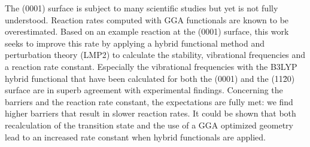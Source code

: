 \documentclass[11pt,DIV=13,BCOR=5mm,a4paper,headinclude]{scrbook}
\begin{document}
% 


The (0001) surface is subject to many scientific studies but yet is not fully understood.
Reaction rates computed with GGA functionals are known to be overestimated.
Based on an example reaction at the (0001) surface, this work seeks to improve this rate by applying a hybrid functional method and perturbation theory (LMP2) to calculate the stability, vibrational frequencies and a reaction rate constant.
Especially the vibrational frequencies with the B3LYP hybrid functional that have been calculated for both the (0001) and the (11\=20) surface are in superb agreement with experimental findings.
Concerning the barriers and the reaction rate constant, the expectations are fully met: we find higher barriers that result in slower reaction rates.
It could be shown that both recalculation of the transition state and the use of a GGA optimized geometry lead to an increased rate constant when hybrid functionals are applied.
\\\\
\end{document}
